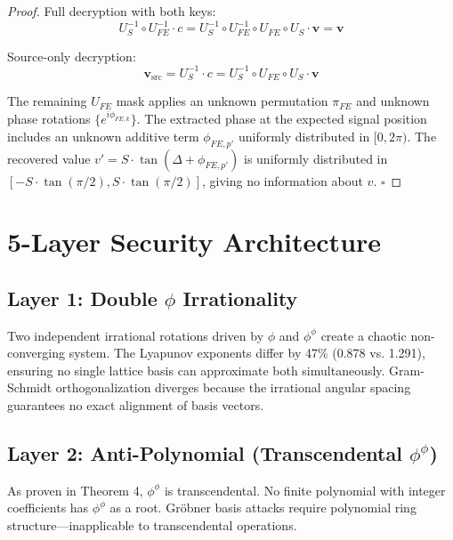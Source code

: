 \documentclass[11pt,a4paper]{article}
\theoremstyle{remark}
\begin{document}
\begin{proof}
Full decryption with both keys:
\begin{equation}
    U_S^{-1} \circ U_{FE}^{-1} \cdot c = U_S^{-1} \circ U_{FE}^{-1} \circ U_{FE} \circ U_S \cdot \mathbf{v} = \mathbf{v}
\end{equation}

Source-only decryption:
\begin{equation}
    \mathbf{v}_{\text{src}} = U_S^{-1} \cdot c = U_S^{-1} \circ U_{FE} \circ U_S \cdot \mathbf{v}
\end{equation}

The remaining $U_{FE}$ mask applies an unknown permutation $\pi_{FE}$ and unknown phase rotations $\{e^{i\phi_{FE,k}}\}$. The extracted phase at the expected signal position includes an unknown additive term $\phi_{FE,p'}$ uniformly distributed in $[0,2\pi)$. The recovered value $v' = S \cdot \tan(\Delta + \phi_{FE,p'})$ is uniformly distributed in $[-S \cdot \tan(\pi/2), S \cdot \tan(\pi/2)]$, giving no information about $v$. \hfill $\square$
\end{proof}

\section{5-Layer Security Architecture}

\subsection{Layer 1: Double $\phi$ Irrationality}

Two independent irrational rotations driven by $\phi$ and $\phi^\phi$ create a chaotic non-converging system. The Lyapunov exponents differ by 47\% (0.878 vs. 1.291), ensuring no single lattice basis can approximate both simultaneously. Gram-Schmidt orthogonalization diverges because the irrational angular spacing guarantees no exact alignment of basis vectors.

\subsection{Layer 2: Anti-Polynomial (Transcendental $\phi^\phi$)}

As proven in Theorem 4, $\phi^\phi$ is transcendental. No finite polynomial with integer coefficients has $\phi^\phi$ as a root. Gröbner basis attacks require polynomial ring structure—inapplicable to transcendental operations.
\end{document}
